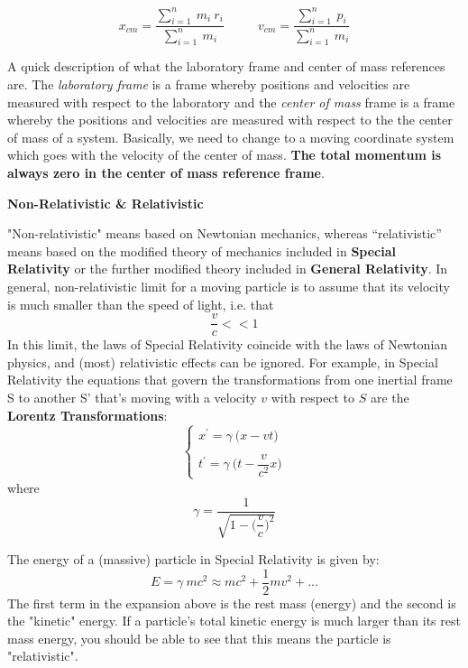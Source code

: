 \documentclass[fleqn]{article}
\begin{document}
$$
  x_{cm}=\dfrac{
    \sum\limits_{i=1}^{n} ~ m_i ~ r_i
  }{
    \sum\limits_{i=1}^{n} ~ m_i
  } ~~~~~~~~~~~~
  v_{cm}=\dfrac{
    \sum\limits_{i=1}^{n} ~ p_i
  }{
    \sum\limits_{i=1}^{n} ~ m_i
  }
$$

A quick description of what the laboratory frame and center of mass references are. The \emph{laboratory frame} is a frame 
whereby positions and velocities are measured with respect to the laboratory and the \emph{center of mass} frame is a frame 
whereby the positions and velocities are measured with respect to the the center of mass of a system. Basically, we need 
to change to a moving coordinate system which goes with the velocity of the center of mass.\textbf{ The total momentum 
is always zero in the center of mass reference frame}.

\vspace{20px}

\textbf{Non-Relativistic \& Relativistic}

\vspace{10px}

"Non-relativistic" means based on Newtonian mechanics, whereas “relativistic” means based on the modified theory 
of mechanics included in \textbf{Special Relativity} or the further modified theory included in \textbf{General Relativity}.
In general, non-relativistic limit for a moving particle is to assume that its velocity is much smaller than the 
speed of light, i.e. that
$$
  \dfrac{v}{c} << 1
$$
In this limit, the laws of Special Relativity coincide with the laws of Newtonian physics, and (most) relativistic effects
can be ignored. For example, in Special Relativity the equations that govern the transformations from one inertial frame S 
to another S' that's moving with a velocity $v$ with respect to $S$ are the \textbf{Lorentz Transformations}:
$$
  \begin{cases}
    x^'=\gamma ~ \bigg( x-vt \bigg)
    \\
    \\
    t^'=\gamma ~ \bigg( t-\dfrac{v}{c^2}x \bigg)
  \end{cases}
$$
where 
$$
  \gamma=\dfrac{1}{\sqrt{1-\bigg( \dfrac{v}{c} \bigg)^2}}
$$

The energy of a (massive) particle in Special Relativity is given by:
$$
  E=\gamma ~ mc^2 \approx mc^2+\dfrac{1}{2} mv^2+...
$$
The first term in the expansion above is the rest mass (energy) and the second is the "kinetic" energy. If a 
particle's total kinetic energy is much larger than its rest mass energy, you should be able to see that this 
means the particle is "relativistic".
\end{document}
